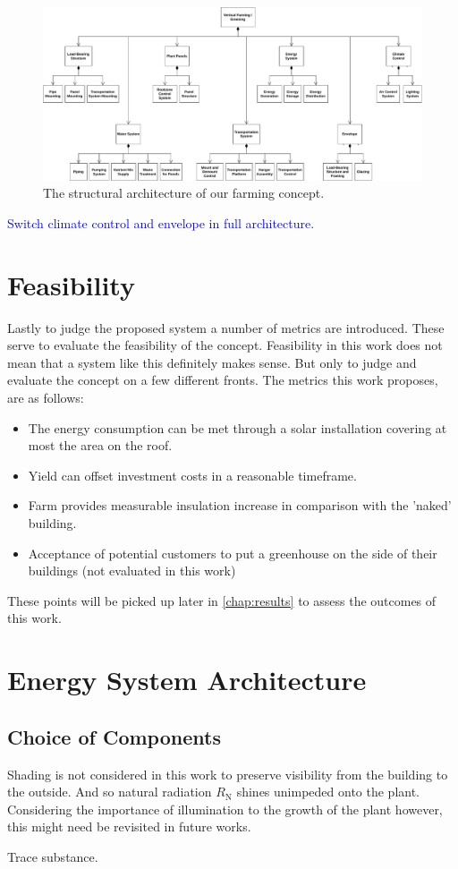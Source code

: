 \begin{figure}[htbp]
  \centering
  \caption{The structural architecture of our farming concept.}
  \label{fig:architecture}
  \includegraphics[width=\textwidth]{img/architecture/architecture.pdf}
\end{figure}
\textcolor{Blue}{Switch climate control and envelope in full architecture.}

\section{Feasibility}
\label{sec:feasibility}
Lastly to judge the proposed system a number of metrics are introduced.
These serve to evaluate the feasibility of the concept.
Feasibility in this work does not mean that a system like this definitely makes sense.
But only to judge and evaluate the concept on a few different fronts.
The metrics this work proposes, are as follows:
\begin{itemize}
	\item The energy consumption can be met through a solar installation covering at most the area on the roof.
	\item Yield can offset investment costs in a reasonable timeframe.
	\item Farm provides measurable insulation increase in comparison with the 'naked' building.
	\item Acceptance of potential customers to put a greenhouse on the side of their buildings (not evaluated in this work)
\end{itemize}
These points will be picked up later in \ref{chap:results} to assess the outcomes of this work.

\section{Energy System Architecture}
\label{sec:architecture}

\subsection{Choice of Components}

Shading is not considered in this work to preserve visibility from the building to the outside.
And so natural radiation $R_\text{N}$ shines unimpeded onto the plant.
Considering the importance of illumination to the growth of the plant however, this might need be revisited in future works.

Trace substance.

